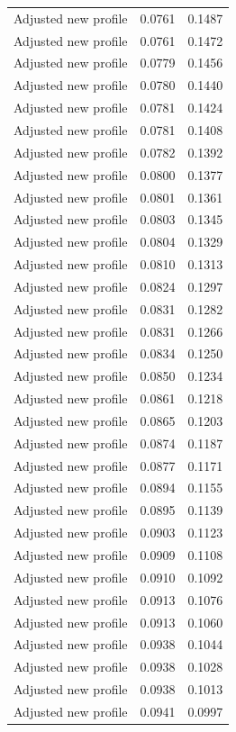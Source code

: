 \begin{table}[htbp]
\begin{tabular}{lll}
Adjusted new profile & 0.0761 & 0.1487 \\
Adjusted new profile & 0.0761 & 0.1472 \\
Adjusted new profile & 0.0779 & 0.1456 \\
Adjusted new profile & 0.0780 & 0.1440 \\
Adjusted new profile & 0.0781 & 0.1424 \\
Adjusted new profile & 0.0781 & 0.1408 \\
Adjusted new profile & 0.0782 & 0.1392 \\
Adjusted new profile & 0.0800 & 0.1377 \\
Adjusted new profile & 0.0801 & 0.1361 \\
Adjusted new profile & 0.0803 & 0.1345 \\
Adjusted new profile & 0.0804 & 0.1329 \\
Adjusted new profile & 0.0810 & 0.1313 \\
Adjusted new profile & 0.0824 & 0.1297 \\
Adjusted new profile & 0.0831 & 0.1282 \\
Adjusted new profile & 0.0831 & 0.1266 \\
Adjusted new profile & 0.0834 & 0.1250 \\
Adjusted new profile & 0.0850 & 0.1234 \\
Adjusted new profile & 0.0861 & 0.1218 \\
Adjusted new profile & 0.0865 & 0.1203 \\
Adjusted new profile & 0.0874 & 0.1187 \\
Adjusted new profile & 0.0877 & 0.1171 \\
Adjusted new profile & 0.0894 & 0.1155 \\
Adjusted new profile & 0.0895 & 0.1139 \\
Adjusted new profile & 0.0903 & 0.1123 \\
Adjusted new profile & 0.0909 & 0.1108 \\
Adjusted new profile & 0.0910 & 0.1092 \\
Adjusted new profile & 0.0913 & 0.1076 \\
Adjusted new profile & 0.0913 & 0.1060 \\
Adjusted new profile & 0.0938 & 0.1044 \\
Adjusted new profile & 0.0938 & 0.1028 \\
Adjusted new profile & 0.0938 & 0.1013 \\
Adjusted new profile & 0.0941 & 0.0997 \\

\end{tabular}
\end{table}
